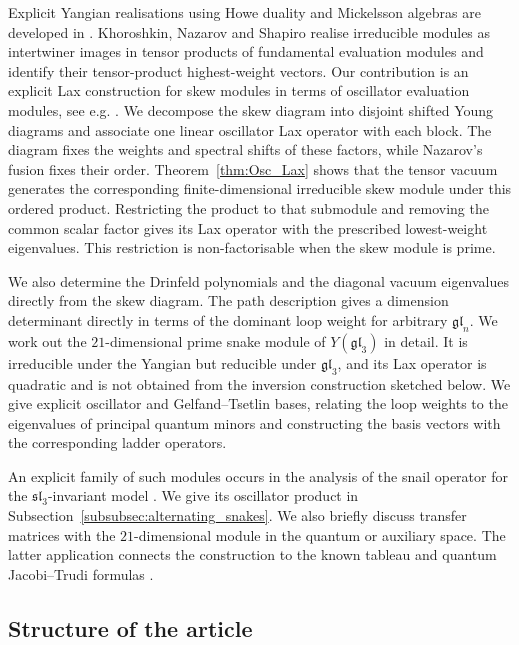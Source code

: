 \documentclass[12pt,reqno]{amsart}
\numberwithin{equation}{section}
\begin{document}
		Explicit Yangian realisations using Howe duality and Mickelsson
		algebras are developed in \cite{KhoroshkinNazarov2012}.
		Khoroshkin, Nazarov and Shapiro
		\cite[Sections~1.2 and~2.2--2.3]{KhoroshkinNazarovShapiro2014}
		realise irreducible modules as intertwiner images in tensor products
		of fundamental evaluation modules and identify their tensor-product
		highest-weight vectors. Our contribution is an explicit Lax
		construction for skew modules in terms of oscillator evaluation
		modules, see e.g. \cite{FKT,Derkachov:2008aq}. We decompose the skew diagram into disjoint
		shifted Young diagrams and associate one linear oscillator Lax
		operator with each block. The diagram fixes the weights and spectral
		shifts of these factors, while Nazarov's fusion fixes their order.
		Theorem~\ref{thm:Osc_Lax} shows that the tensor vacuum generates
		the corresponding finite-dimensional irreducible skew module under
		this ordered product. Restricting the product to that submodule
		and removing the common scalar factor gives its Lax operator with
		the prescribed lowest-weight eigenvalues. This restriction is
		non-factorisable when the skew module is prime.
		
		We also determine the Drinfeld polynomials and the diagonal
		vacuum eigenvalues directly from the skew diagram.
		The path description gives a dimension determinant directly in
		terms of the dominant loop weight for arbitrary $\mathfrak{gl}_n$. We work out the $21$-dimensional prime snake
		module of $Y(\mathfrak{gl}_3)$ in detail. It is irreducible under
		the Yangian but reducible under $\mathfrak{gl}_3$, and its Lax
		operator is quadratic and is not obtained from the inversion
		construction sketched below. We give explicit oscillator and Gelfand--Tsetlin
		bases, relating the loop weights to the eigenvalues of principal
		quantum minors and constructing the basis vectors with the
		corresponding ladder operators.




An explicit family of such modules occurs in the analysis of the
snail operator for the $\mathfrak{sl}_3$-invariant model
\cite[Section~4.1]{JuergensBoos2025}. We give its oscillator product
in Subsection~\ref{subsubsec:alternating_snakes}. We also briefly discuss
transfer matrices with the $21$-dimensional module in the quantum
or auxiliary space. The latter application connects the construction
to the known tableau and quantum Jacobi--Trudi formulas
\cite{Tsuboi1997,LuMukhin2021}.

	\subsection{Structure of the article}
\end{document}

